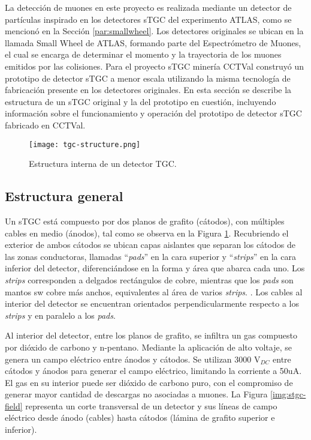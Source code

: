 
La detección de muones en este proyecto es realizada mediante un detector de partículas inspirado en los detectores sTGC del experimento ATLAS, como se mencionó en la Sección  \ref{par:smallwheel}. Los detectores originales se ubican en la llamada Small Wheel de ATLAS, formando parte del Espectrómetro de Muones, el cual se encarga de determinar el momento y la trayectoria de los muones emitidos por las colisiones. Para el proyecto sTGC minería CCTVal construyó  un prototipo de detector sTGC a menor escala utilizando la misma tecnología de fabricación presente en los detectores originales. En esta sección se describe la estructura de un sTGC original y la del prototipo en cuestión, incluyendo información sobre el funcionamiento y operación del prototipo de detector sTGC fabricado en CCTVal.

\begin{figure}[h]
	\centering
	\texttt{[image: tgc-structure.png]}
	\caption{Estructura interna de un detector TGC\cite{Chapman2014ATLASUpgrade}.}
	\label{img:stgc-structure}
\end{figure}

\subsection{Estructura general}  

	Un sTGC está compuesto por dos planos de grafito (cátodos), con múltiples cables en medio (ánodos)\cite{Formenti2018CERNReport}, tal como se observa en la Figura \ref{img:stgc-structure}. Recubriendo el exterior de ambos cátodos se ubican capas aislantes que separan los cátodos de las zonas conductoras, llamadas ``\textit{pads}'' en la cara superior y ``\textit{strips}'' en la cara inferior del detector, diferenciándose en la forma y área que abarca cada uno. Los \textit{strips} corresponden a delgados rectángulos de cobre, mientras que los \textit{pads} son mantos sw cobre más anchos, equivalentes al área de varios \textit{strips}. . Los cables al interior del detector se encuentran orientados perpendicularmente respecto a los \textit{strips} y en paralelo a los \textit{pads}.
	
	Al interior del detector, entre los planos de grafito, se infiltra un gas compuesto por dióxido de carbono y n-pentano\cite{Formenti2018CERNReport}. Mediante la aplicación de alto voltaje, se genera un campo eléctrico entre ánodos y cátodos. Se utilizan 3000 V$_{DC}$ entre cátodos y ánodos para generar el campo eléctrico, limitando la corriente a 50uA. El gas en su interior puede ser dióxido de carbono puro, con el compromiso de generar mayor cantidad de descargas no asociadas a muones. La Figura \ref{img:stgc-field} representa un corte transversal de un detector y sus líneas de campo eléctrico desde ánodo (cables) hasta cátodos (lámina de grafito superior e inferior). 
	
